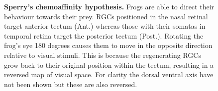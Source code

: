 \begin{figure}[!ht]
            \caption[\textbf{\label{fig:I_frog_sperry}\textbf{Sperry’s chemoaffinity hypothesis.}}]{\textbf{\label{fig:I_frog_sperry}Sperry’s chemoaffinity hypothesis.} Frogs are able to direct their behaviour towards their prey. RGCs positioned in the nasal retinal target anterior tectum (Ant.) whereas those with their somatas in temporal retina target the posterior tectum (Post.). Rotating the frog’s eye 180 degrees causes them to move in the opposite direction relative to visual stimuli. This is because the regenerating RGCs grow back to their original position within the tectum, resulting in a reversed map of visual space. For clarity the dorsal ventral axis have not been shown but these are also reversed.}
      \end{figure}

